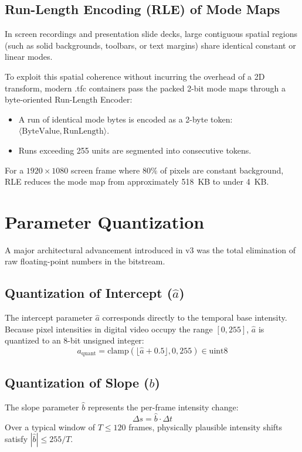 \subsection{Run-Length Encoding (RLE) of Mode Maps}
In screen recordings and presentation slide decks, large contiguous spatial regions (such as solid backgrounds, toolbars, or text margins) share identical constant or linear modes. 

To exploit this spatial coherence without incurring the overhead of a 2D transform, modern .tfc containers pass the packed 2-bit mode maps through a byte-oriented Run-Length Encoder:
\begin{itemize}
    \item A run of identical mode bytes is encoded as a 2-byte token: $\langle \text{ByteValue}, \text{RunLength} \rangle$.
    \item Runs exceeding 255 units are segmented into consecutive tokens.
\end{itemize}
For a $1920 \times 1080$ screen frame where $80\%$ of pixels are constant background, RLE reduces the mode map from approximately 518~KB to under 4~KB.

\section{Parameter Quantization}
A major architectural advancement introduced in v3 was the total elimination of raw floating-point numbers in the bitstream.

\subsection{Quantization of Intercept ($\hat{a}$)}
The intercept parameter $\hat{a}$ corresponds directly to the temporal base intensity. Because pixel intensities in digital video occupy the range $[0, 255]$, $\hat{a}$ is quantized to an 8-bit unsigned integer:
\begin{equation}
    a_{\text{quant}} = \text{clamp}\left(\lfloor \hat{a} + 0.5 \rfloor, 0, 255\right) \in \text{uint8}
\end{equation}

\subsection{Quantization of Slope ($\hat{b}$)}
The slope parameter $\hat{b}$ represents the per-frame intensity change:
\begin{equation}
    \Delta s = \hat{b} \cdot \Delta t
\end{equation}
Over a typical window of $T \le 120$ frames, physically plausible intensity shifts satisfy $|\hat{b}| \le 255 / T$.

